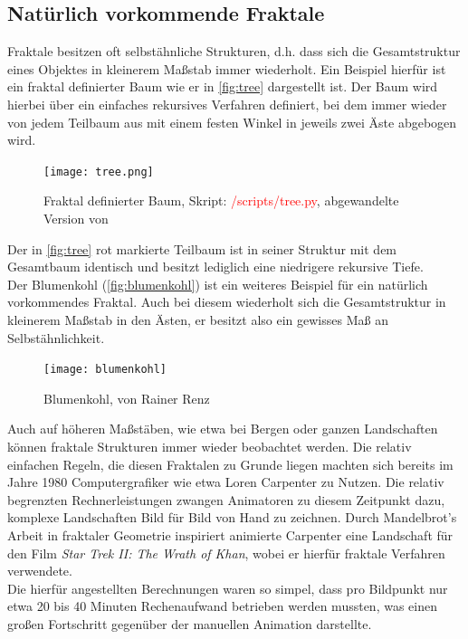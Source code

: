 \documentclass[a4paper,12pt,onesided]{report}
\begin{document}
\subsection{Natürlich vorkommende Fraktale}
\label{sec:natfrac}
Fraktale besitzen oft selbstähnliche Strukturen, d.h. dass sich die Gesamtstruktur eines Objektes in kleinerem Maßstab immer wiederholt. Ein Beispiel hierfür ist ein fraktal definierter Baum wie er in \autoref{fig:tree} dargestellt ist. Der Baum wird hierbei über ein einfaches rekursives Verfahren definiert, bei dem immer wieder von jedem Teilbaum aus mit einem festen Winkel in jeweils zwei Äste abgebogen wird.

\begin{figure}[H]
	\centering
	\texttt{[image: tree.png]}
	\caption{Fraktal definierter Baum, Skript: \textcolor{red}{/scripts/tree.py}, abgewandelte Version von \cite{soTree}}
	\label{fig:tree}
\end{figure}

Der in \autoref{fig:tree} rot markierte Teilbaum ist in seiner Struktur mit dem Gesamtbaum identisch und besitzt lediglich eine niedrigere rekursive Tiefe.\\
Der Blumenkohl (\autoref{fig:blumenkohl}) ist ein weiteres Beispiel für ein natürlich vorkommendes Fraktal. 
Auch bei diesem wiederholt sich die Gesamtstruktur in kleinerem Maßstab in den Ästen, er besitzt also ein gewisses Maß an Selbstähnlichkeit.

\begin{figure}[H]
	\centering
	\texttt{[image: blumenkohl]}
	\caption{Blumenkohl, von Rainer Renz}
	\label{fig:blumenkohl}
\end{figure}

Auch auf höheren Maßstäben, wie etwa bei Bergen oder ganzen Landschaften können fraktale Strukturen immer wieder beobachtet werden. 
Die relativ einfachen Regeln, die diesen Fraktalen zu Grunde liegen machten sich bereits im Jahre 1980 Computergrafiker wie etwa Loren Carpenter zu Nutzen. Die relativ begrenzten Rechnerleistungen zwangen Animatoren zu diesem Zeitpunkt dazu, komplexe Landschaften Bild für Bild von Hand zu zeichnen. Durch Mandelbrot's Arbeit in fraktaler Geometrie inspiriert animierte Carpenter eine Landschaft für den Film \textit{Star Trek II: The Wrath of Khan}, wobei er hierfür fraktale Verfahren verwendete. \cite{startrekFractals}\\
Die hierfür angestellten Berechnungen waren so simpel, dass pro Bildpunkt nur etwa 20 bis 40 Minuten Rechenaufwand betrieben werden mussten, was einen großen Fortschritt gegenüber der manuellen Animation darstellte. \cite{carpenterVolLibre}\\
\end{document}
